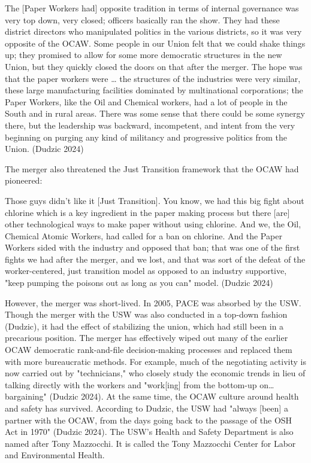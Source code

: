 \documentclass[12pt]{article}
\renewenvironment{quote}
  {\list{}{\leftmargin=\parindent\rightmargin=0pt}%
   \item\relax}
  {\endlist}
\begin{document}
\begin{quote}
The [Paper Workers had] opposite tradition in terms of internal governance was very top down, very closed; officers basically ran the show. They had these district directors who manipulated politics in the various districts, so it was very opposite of the OCAW. Some people in our Union felt that we could shake things up; they promised to allow for some more democratic structures in the new Union, but they quickly closed the doors on that after the merger. The hope was that the paper workers were … the structures of the industries were very similar, these large manufacturing facilities dominated by multinational corporations; the Paper Workers, like the Oil and Chemical workers, had a lot of people in the South and in rural areas. There was some sense that there could be some synergy there, but the leadership was backward, incompetent, and intent from the very beginning on purging any kind of militancy and progressive politics from the Union. (Dudzic 2024)
\end{quote}

The merger also threatened the Just Transition framework that the OCAW had pioneered:

\begin{quote}
Those guys didn't like it [Just Transition]. You know, we had this big fight about chlorine which is a key ingredient in the paper making process but there [are] other technological ways to make paper without using chlorine. And we, the Oil, Chemical Atomic Workers, had called for a ban on chlorine. And the Paper Workers sided with the industry and opposed that ban; that was one of the first fights we had after the merger, and we lost, and that was sort of the defeat of the worker-centered, just transition model as opposed to an industry supportive, "keep pumping the poisons out as long as you can" model. (Dudzic 2024)
\end{quote}

However, the merger was short-lived. In 2005, PACE was absorbed by the USW. Though the merger with the USW was also conducted in a top-down fashion (Dudzic), it had the effect of stabilizing the union, which had still been in a precarious position. The merger has effectively wiped out many of the earlier OCAW democratic rank-and-file decision-making processes and replaced them with more bureaucratic methods. For example, much of the negotiating activity is now carried out by "technicians," who closely study the economic trends in lieu of talking directly with the workers and "work[ing] from the bottom-up on…bargaining" (Dudzic 2024). At the same time, the OCAW culture around health and safety has survived. According to Dudzic, the USW had "always [been] a partner with the OCAW, from the days going back to the passage of the OSH Act in 1970" (Dudzic 2024). The USW’s Health and Safety Department is also named after Tony Mazzocchi. It is called the Tony Mazzocchi Center for Labor and Environmental Health.
\end{document}
